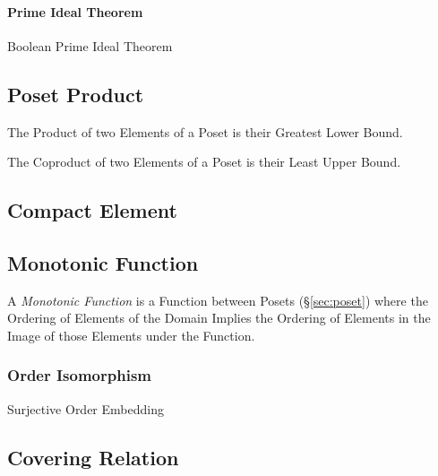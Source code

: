 \paragraph{Prime Ideal Theorem}\label{sec:prime_ideal}\hfill

Boolean Prime Ideal Theorem



\subsection{Poset Product}\label{sec:poset_product}

The Product of two Elements of a Poset is their Greatest Lower Bound.

The Coproduct of two Elements of a Poset is their Least Upper Bound.



\subsection{Compact Element}\label{sec:compact_element}

\subsection{Monotonic Function}\label{sec:monotonic_function}

A \emph{Monotonic Function} is a Function between Posets
(\S\ref{sec:poset}) where the Ordering of Elements of the Domain
Implies the Ordering of Elements in the Image of those Elements under
the Function.



\subsubsection{Order Isomorphism}\label{sec:order_isomorphism}

Surjective Order Embedding



\subsection{Covering Relation}\label{sec:covering_relation}

